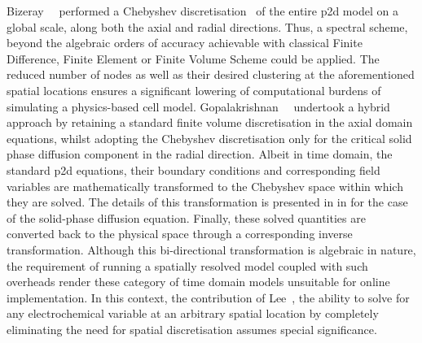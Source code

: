 Bizeray~\etal{}~\cite{Bizeray2015}         performed         a         Chebyshev
discretisation~\cite{Trefethen2000}  of   the  entire   \gls{p2d}  model   on  a
global  scale,  \ie{}  along  both   the  axial  and  radial  directions.  Thus,
a  spectral  scheme,   beyond  the  algebraic  orders   of  accuracy  achievable
with  classical  Finite  Difference,  Finite Element  or  Finite  Volume  Scheme
could  be  applied.  The reduced  number  of  nodes  as  well as  their  desired
clustering  at  the  aforementioned  spatial  locations  ensures  a  significant
lowering  of computational  burdens of  simulating a  physics-based cell  model.
Gopalakrishnan~\etal{}~\cite{Gopalakrishnan2018} undertook a  hybrid approach by
retaining a standard finite volume discretisation in the axial domain equations,
whilst adopting the  Chebyshev discretisation only for the  critical solid phase
diffusion component in the radial direction. Albeit in time domain, the standard
\gls{p2d} equations, their boundary conditions and corresponding field variables
are  mathematically transformed  to the  Chebyshev space  within which  they are
solved.  The details  of this  transformation is  presented in   in   for  the case  of the  solid-phase diffusion
equation.  Finally,   these  solved  quantities   are  converted  back   to  the
physical  space through  a corresponding  inverse transformation.  Although this
bi-directional transformation is algebraic in nature, the requirement of running
a spatially resolved model coupled with  such overheads render these category of
time domain  models unsuitable for  online implementation. In this  context, the
contribution of Lee~\etal{}, \ie{} the  ability to solve for any electrochemical
variable at an arbitrary spatial location by completely eliminating the need for
spatial discretisation assumes special significance.

